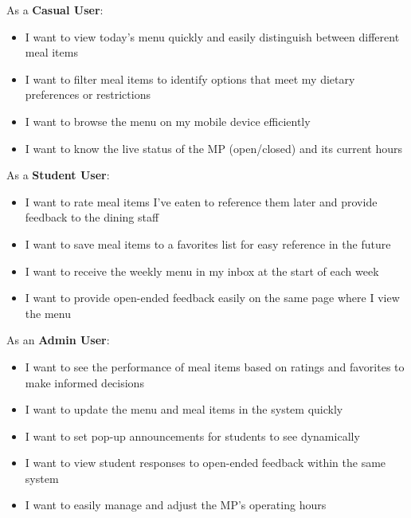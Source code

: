 \documentclass[10pt,twocolumn]{article}
\begin{document}
As a \textbf{Casual User}:\vspace{-1em}
\begin{itemize}
   \item  I want to view today’s menu quickly and easily distinguish between different meal items
    \item I want to filter meal items to identify options that meet my dietary preferences or restrictions
    \item I want to browse the menu on my mobile device efficiently
    \item I want to know the live status of the MP (open/closed) and its current hours
\end{itemize}
As a \textbf{Student User}:\vspace{-1em}
\begin{itemize}
   \item I want to rate meal items I’ve eaten to reference them later and provide feedback to the dining staff
    \item I want to save meal items to a favorites list for easy reference in the future
    \item I want to receive the weekly menu in my inbox at the start of each week
    \item I want to provide open-ended feedback easily on the same page where I view the menu
\end{itemize}
As an \textbf{Admin User}:\vspace{-1em}
\begin{itemize}
   \item I want to see the performance of meal items based on ratings and favorites to make informed decisions
    \item I want to update the menu and meal items in the system quickly
    \item I want to set pop-up announcements for students to see dynamically
    \item I want to view student responses to open-ended feedback within the same system
    \item I want to easily manage and adjust the MP’s operating hours
\end{itemize}
\end{document}
